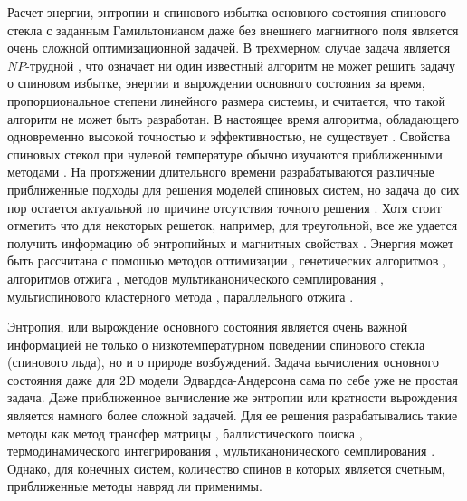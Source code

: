 \documentclass[utf8, babel, sor, jor, amsmath, amssymb, reprint]{elsarticle} %
\begin{document}
Расчет энергии, энтропии и спинового избытка основного состояния спинового стекла с заданным Гамильтонианом даже без внешнего магнитного поля является очень сложной оптимизационной задачей. В трехмерном случае задача является $NP$-трудной \cite{barahona1982computational, hartmann2002optimization}, что означает ни один известный алгоритм не может решить задачу о спиновом избытке, энергии и вырождении основного состояния за время, пропорциональное степени линейного размера системы, и считается, что такой алгоритм не может быть разработан. В настоящее время алгоритма, обладающего одновременно высокой точностью и эффективностью, не существует \cite{fan2023searching}. Свойства спиновых стекол при нулевой температуре обычно изучаются приближенными методами \cite{roma2009ground, perez2012ground}. На протяжении длительного времени разрабатываются различные приближенные подходы для решения моделей спиновых систем, но задача до сих пор остается актуальной по причине отсутствия точного решения \cite{ rybin2022hybrid, makarova2023canonical,farias2024differentiable}. Хотя стоит отметить что для некоторых решеток, например, для треугольной, все же удается получить информацию об энтропийных и магнитных свойствах \cite{jurvcivsinova2024classical}. Энергия может быть рассчитана с помощью методов оптимизации \cite{hartmann2002optimization, hartmann2004new}, генетических алгоритмов \cite{holland1992adaptation}, алгоритмов отжига \cite{kirkpatrick1983optimization}, методов мультиканонического семплирования \cite{berg1994ground, shevchenko2017multicanonical}, мультиспинового кластерного метода \cite{makarova2023canonical}, параллельного отжига \cite{PhysRevB.50.16444, roma2009ground}. 

Энтропия, или вырождение основного состояния является очень важной информацией не только о низкотемпературном поведении спинового стекла (спинового льда), но и о природе возбуждений. Задача вычисления основного состояния даже для 2D модели Эдвардса-Андерсона сама по себе уже не простая задача. Даже приближенное вычисление же энтропии или кратности вырождения является намного более сложной задачей. Для ее решения разрабатывались такие методы как метод трансфер матрицы \cite{PhysRevB.22.288, cheung1983equilibrium, kolan1982ground}, баллистического поиска \cite{hartmann2000ground}, термодинамического интегрирования \cite{kirkpatrick1977frustration, binder1985monte, roma2004ground}, мультиканонического семплирования \cite{berg1994ground, shevchenko2017multicanonical}. Однако, для конечных систем, количество спинов в которых является счетным, приближенные методы навряд ли применимы. 
\end{document}
